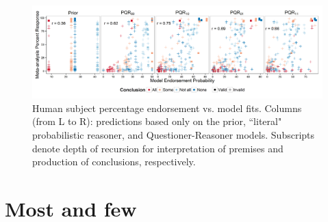 \documentclass[10pt,letterpaper]{article}
\begin{document}

\begin{figure}[t!] %
\centering
	\subfigure
		\centering
  \includegraphics[width=\textwidth]{fig2_multiScatter_n6_br25_alpha2}
  \caption{Human subject percentage endorsement vs. model fits.
  Columns (from L to R): predictions based only on the prior, ``literal" probabilistic reasoner, and Questioner-Reasoner models. Subscripts denote depth of recursion for interpretation of premises and production of conclusions, respectively.}
  \label{fig:megaScatter}

\end{figure}






\section{Most and few}
\end{document}
